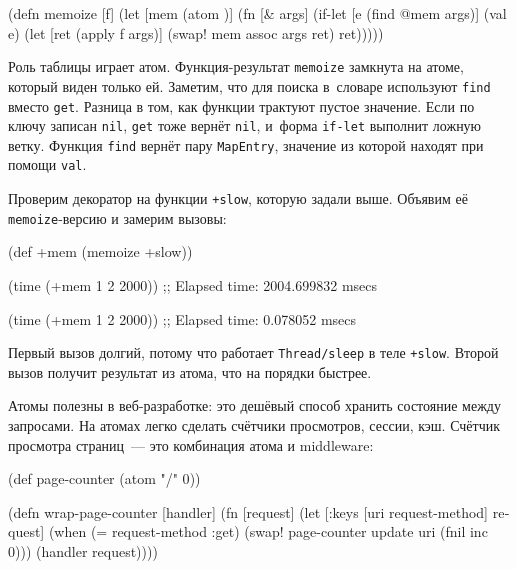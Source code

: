 \begin{english}
  \begin{clojure}
(defn memoize [f]
  (let [mem (atom {})]
    (fn [& args]
      (if-let [e (find @mem args)]
        (val e)
        (let [ret (apply f args)]
          (swap! mem assoc args ret)
          ret)))))
  \end{clojure}
\end{english}

Роль таблицы играет атом. Функция-ре\-зуль\-тат \verb|memoize| замкнута на
атоме, который виден только ей. Заметим, что для поиска в~словаре используют
\verb|find| вместо \verb|get|. Разница в том, как функции трактуют пустое
значение. Если по ключу записан \verb|nil|, \verb|get| тоже вернёт \verb|nil|,
и~форма \verb|if-let| выполнит ложную ветку. Функция \verb|find| вернёт пару
\verb|MapEntry|, значение из которой находят при помощи \verb|val|.

Проверим декоратор на функции \verb|+slow|, которую задали выше. Объявим её
\verb|memoize|-версию и замерим вызовы:

\begin{english}
  \begin{clojure}
(def +mem (memoize +slow))

(time (+mem 1 2 2000))
;; Elapsed time: 2004.699832 msecs

(time (+mem 1 2 2000))
;; Elapsed time: 0.078052 msecs
  \end{clojure}
\end{english}


Первый вызов долгий, потому что работает \verb|Thread/sleep| в теле
\verb|+slow|. Второй вызов получит результат из атома, что на порядки быстрее.


Атомы полезны в веб-разработке: это дешёвый способ хранить состояние между
запросами. На атомах легко сделать счётчики просмотров, сессии, кэш. Счётчик
просмотра страниц~--- это комбинация атома и middleware:

\ifnarrow

\begin{english}
  \begin{clojure}
(def page-counter
  (atom {"/" 0}))

(defn wrap-page-counter
  [handler]
  (fn [request]
    (let [{:keys [uri request-method]}
          request]
      (when (= request-method :get)
        (swap! page-counter
          update uri (fnil inc 0)))
      (handler request))))
  \end{clojure}
\end{english}

